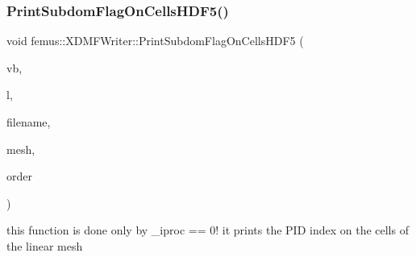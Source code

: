 \mbox{\label{classfemus_1_1_x_d_m_f_writer_af4c2f49689ab328ff535e7449cd2cb36}} 
\subsubsection{\texorpdfstring{Print\+Subdom\+Flag\+On\+Cells\+H\+D\+F5()}{PrintSubdomFlagOnCellsHDF5()}}
{\footnotesize\ttfamily void femus\+::\+X\+D\+M\+F\+Writer\+::\+Print\+Subdom\+Flag\+On\+Cells\+H\+D\+F5 (\begin{DoxyParamCaption}\item[{const \mbox{\hyperlink{_typedefs_8hpp_a91ad9478d81a7aaf2593e8d9c3d06a14}{uint}}}]{vb,  }\item[{const int}]{l,  }\item[{std\+::string}]{filename,  }\item[{const \mbox{\hyperlink{classfemus_1_1_multi_level_mesh_two}{Multi\+Level\+Mesh\+Two}} \&}]{mesh,  }\item[{const \mbox{\hyperlink{_typedefs_8hpp_a91ad9478d81a7aaf2593e8d9c3d06a14}{uint}}}]{order }\end{DoxyParamCaption})\hspace{0.3cm}{\ttfamily [static]}}

this function is done only by \+\_\+iproc == 0! it prints the P\+ID index on the cells of the linear mesh \mbox{\label{classfemus_1_1_x_d_m_f_writer_a5b5754053f696120b6acdc462ee60367}} 
